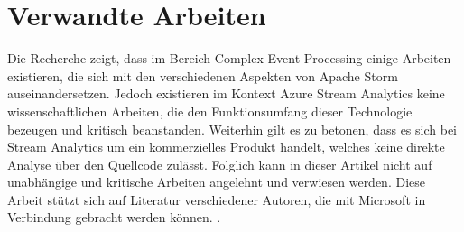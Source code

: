 \section{Verwandte Arbeiten}
Die Recherche zeigt, dass im Bereich Complex Event Processing einige Arbeiten existieren, die sich mit den verschiedenen Aspekten von Apache Storm auseinandersetzen. Jedoch existieren im Kontext Azure Stream Analytics keine wissenschaftlichen Arbeiten, die den Funktionsumfang dieser Technologie bezeugen und kritisch beanstanden. Weiterhin gilt es zu betonen, dass es sich bei Stream Analytics um ein kommerzielles Produkt handelt, welches keine direkte Analyse über den Quellcode zulässt. Folglich kann in dieser Artikel nicht auf unabhängige und kritische Arbeiten angelehnt und verwiesen werden. Diese Arbeit stützt sich auf Literatur verschiedener Autoren, die mit Microsoft in Verbindung gebracht werden können. \cite{Familiar.2017} \cite{Klein.2017}. 